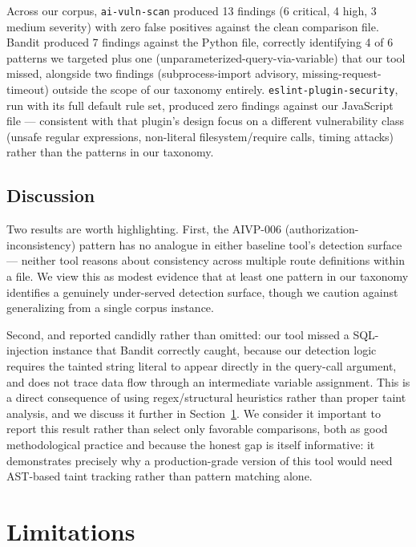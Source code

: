 \documentclass[11pt]{article}
\begin{document}
Across our corpus, \texttt{ai-vuln-scan} produced 13 findings (6 critical,
4 high, 3 medium severity) with zero false positives against the clean
comparison file. Bandit produced 7 findings against the Python file,
correctly identifying 4 of 6 patterns we targeted plus one
(unparameterized-query-via-variable) that our tool missed, alongside two
findings (subprocess-import advisory, missing-request-timeout) outside
the scope of our taxonomy entirely. \texttt{eslint-plugin-security},
run with its full default rule set, produced zero findings against our
JavaScript file --- consistent with that plugin's design focus on a
different vulnerability class (unsafe regular expressions, non-literal
filesystem/require calls, timing attacks) rather than the patterns in our
taxonomy.

\subsection{Discussion}

Two results are worth highlighting. First, the AIVP-006
(authorization-inconsistency) pattern has no analogue in either baseline
tool's detection surface --- neither tool reasons about consistency across
multiple route definitions within a file. We view this as modest evidence
that at least one pattern in our taxonomy identifies a genuinely
under-served detection surface, though we caution against generalizing
from a single corpus instance.

Second, and reported candidly rather than omitted: our tool missed a
SQL-injection instance that Bandit correctly caught, because our
detection logic requires the tainted string literal to appear directly
in the query-call argument, and does not trace data flow through an
intermediate variable assignment. This is a direct consequence of using
regex/structural heuristics rather than proper taint analysis, and we
discuss it further in Section~\ref{sec:limitations}. We consider it
important to report this result rather than select only favorable
comparisons, both as good methodological practice and because the honest
gap is itself informative: it demonstrates precisely why a
production-grade version of this tool would need AST-based taint
tracking rather than pattern matching alone.

\section{Limitations}
\label{sec:limitations}
\end{document}
